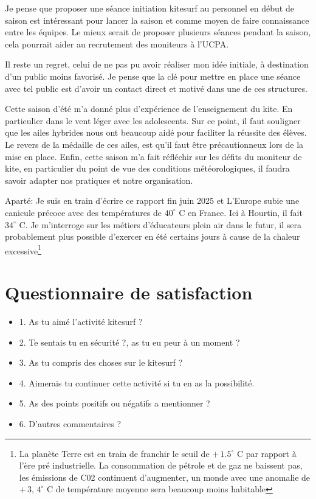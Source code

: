 \documentclass[11pt,a4paper]{report}
\begin{document}
Je pense que proposer une séance initiation kitesurf au 
personnel en début de saison est intéressant pour lancer la saison
et comme moyen de faire connaissance entre les équipes. Le mieux serait de proposer plusieurs séances pendant la saison, cela pourrait aider au recrutement 
des moniteurs à  l'UCPA.

Il reste un regret, celui de ne pas pu avoir réaliser mon idée initiale, 
à destination d'un public moins favorisé. 
Je pense que la clé pour
mettre en place une séance avec tel public est d'avoir un contact
direct et motivé dans une de ces structures.


Cette saison d'été m'a donné plus d'expérience  
de l'enseignement du kite. En particulier dans le vent léger avec les adolescents.
Sur ce point, il faut souligner que les ailes hybrides nous ont beaucoup aidé pour 
faciliter la réussite des élèves. Le revers de la médaille de ces ailes, est qu'il 
faut \^etre précautionneux lors de la mise en place.
Enfin, cette saison m'a fait réfléchir sur les défits du moniteur de kite, en 
particulier du point de vue des conditions météorologiques, il faudra savoir
adapter nos pratiques et notre organisation.

Aparté: Je suis en train d'écrire ce rapport fin juin 2025 et L’Europe subie
une canicule précoce avec des températures de $40^{\circ}$ C en France. Ici à Hourtin, 
il fait $34^{\circ}$ C.
Je m'interroge sur les métiers d'éducateurs plein air dans le futur, il sera
probablement plus possible d'exercer en été certains jours
à cause de la chaleur excessive\footnote{
La planète Terre est en train de franchir le seuil  de  $+\, 1.5^{\circ}$ C par rapport
 à l'ère pré industrielle. La consommation de pétrole et de gaz ne baissent pas, les 
émissions de C02 continuent d'augmenter\cite{giec}, un monde avec une anomalie de $+\, 3,\, 4^{\circ}$ C  de température moyenne sera beaucoup moins habitable}

\appendix
\appendixpage
\addappheadtotoc
\chapter{Questionnaire de satisfaction\label{questionnaire}}
\begin{itemize}
\item 1. As tu aimé l'activité kitesurf ?
\item 2. Te sentais tu en sécurité ?, as tu eu peur à un moment ?
\item 3. As tu compris des choses sur le kitesurf ?
\item 4. Aimerais tu continuer cette activité si tu en as la possibilité.
\item 5. As des points positifs ou négatifs a mentionner ?
\item 6. D'autres commentaires ?
\end{itemize}
\end{document}
